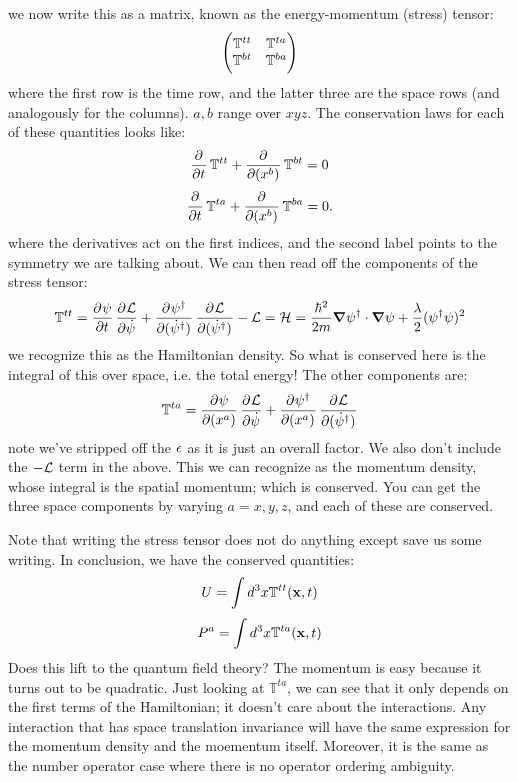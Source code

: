 we now write this as a matrix, known as the energy-momentum (stress) tensor:
\begin{equation}
    \begin{pmatrix}\mathbb{T}^{tt} &\mathbb{T}^{ta} \\ \mathbb{T}^{bt} & \mathbb{T}^{ba}\end{pmatrix}
\end{equation}
where the first row is the time row, and the latter three are the space rows (and analogously for the columns). $a, b$ range over $xyz$. The conservation laws for each of these quantities looks like:
\begin{equation}
    \dpd{}{t}\mathbb{T}^{tt} + \dpd{}{(x^b)}\mathbb{T}^{bt} = 0
\end{equation}
\begin{equation}
    \dpd{}{t}\mathbb{T}^{ta} + \dpd{}{(x^b)}\mathbb{T}^{ba} = 0.
\end{equation}
where the derivatives act on the first indices, and the second label points to the symmetry we are talking about. We can then read off the components of the stress tensor:
\begin{equation}
    \mathbb{T}^{tt} = \dpd{\psi}{t}\dpd{\L}{\dot{\psi}} + \dpd{\psi^\dag}{(\dot{\psi}^\dag)}\dpd{\L}{(\dot{\psi}^\dag)} - \L = \H = \frac{\hbar^2}{2m}\nabla \psi^\dag \cdot \nabla \psi + \frac{\lambda}{2}(\psi^\dag\psi)^2
\end{equation}
we recognize this as the Hamiltonian density. So what is conserved here is the integral of this over space, i.e. the total energy! The other components are:
\begin{equation}
    \mathbb{T}^{ta} = \dpd{\psi}{(x^a)}\dpd{\L}{\dot{\psi}} + \dpd{\psi^\dag}{(x^a)}\dpd{\L}{(\dot{\psi}^\dag)}
\end{equation}
note we've stripped off the $\epsilon$ as it is just an overall factor. We also don't include the $-\mathcal{L}$ term in the above. This we can recognize as the momentum density, whose integral is the spatial momentum; which is conserved. You can get the three space components by varying $a = x,y,z$, and each of these are conserved.

Note that writing the stress tensor does not do anything except save us some writing. In conclusion, we have the conserved quantities:
\begin{equation}
    U = \int d^3 x \mathbb{T}^{tt}(\mathbf{x}, t)
\end{equation}
\begin{equation}
    P^a = \int d^3x \mathbb{T}^{ta}(\mathbf{x}, t)
\end{equation}
Does this lift to the quantum field theory? The momentum is easy because it turns out to be quadratic. Just looking at $\mathbb{T}^{ta}$, we can see that it only depends on the first terms of the Hamiltonian; it doesn't care about the interactions. Any interaction that has space translation invariance will have the same expression for the momentum density and the moementum itself. Moreover, it is the same as the number operator case where there is no operator ordering ambiguity.

